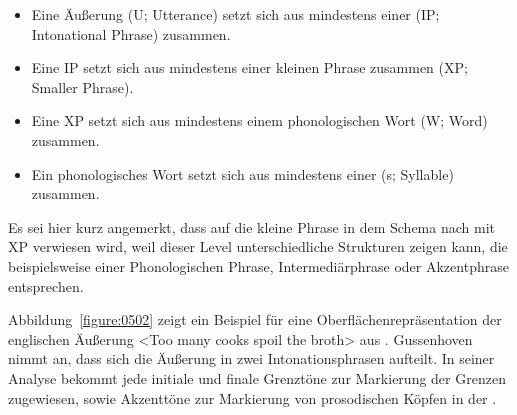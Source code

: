 \begin{itemize}
	\item Eine Äußerung (U; Utterance) setzt sich aus mindestens einer  (IP; Intonational Phrase) zusammen.
	\item Eine IP setzt sich aus mindestens einer kleinen Phrase zusammen (XP; Smaller Phrase).
	\item Eine XP setzt sich aus mindestens einem phonologischen Wort (W; Word) zusammen.
	\item Ein phonologisches Wort setzt sich aus mindestens einer  (s; Syllable) zusammen.
\end{itemize}

Es sei hier kurz angemerkt, dass auf die kleine Phrase in dem Schema nach \citet{Grice2006} mit XP verwiesen wird, weil dieser Level unterschiedliche Strukturen zeigen kann, die beispielsweise einer Phonologischen Phrase, Intermediärphrase oder Akzentphrase entsprechen.

Abbildung~\ref{figure:0502} zeigt ein Beispiel für eine Oberflächenrepräsentation der englischen Äußerung <Too many cooks spoil the broth> aus \citet{Gussenhoven2004}. Gussenhoven nimmt an, dass sich die Äußerung in zwei Intonationsphrasen aufteilt. In seiner Analyse bekommt jede  initiale und finale Grenztöne zur Markierung der Grenzen zugewiesen, sowie Akzenttöne zur Markierung von prosodischen Köpfen in der .

